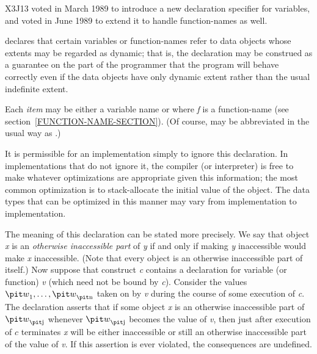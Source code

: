 \begin{newer}
X3J13 voted in March 1989  to introduce a new
declaration specifier  for variables,
and voted in June 1989 
to extend it to handle function-names as well.
\begin{flushdesc}
\item[\cdf{dynamic-extent}]

declares that certain variables or function-names refer to data objects
whose extents may be regarded as dynamic; that is, the declaration
may be construed as a guarantee on the part of the programmer that
the program will behave correctly even if the data objects have only
dynamic extent rather than the usual indefinite extent.

Each {\it item} may be either a variable name or 
where {\it f} is a function-name (see section~\ref{FUNCTION-NAME-SECTION}).
(Of course,  may be abbreviated in the usual way
as .)

  It is permissible for an implementation simply to ignore this declaration.
  In implementations that do not ignore it, the compiler (or interpreter)
  is free to make whatever optimizations are appropriate given this
  information; the most common optimization is to stack-allocate the
  initial value of the object. The data types that can be optimized in this manner
  may vary from implementation to implementation.

The meaning of this declaration can be stated more precisely.
We say that
object {\it x} is an {\it otherwise inaccessible part}
    of {\it y} if and only if making {\it y} inaccessible would make {\it x} inaccessible.
    (Note that every object is an otherwise inaccessible part of itself.)
  Now suppose that construct {\it c} contains a  declaration for
  variable (or function) {\it v} (which need not be bound by {\it c}).  Consider the values
  ${\it w}_1, \ldots, {\it w}_{\hbox{\scriptsize\it n}}$ taken on by {\it v} during the course of some execution of
  {\it c}.  The declaration asserts that if some object {\it x}
  is an otherwise inaccessible part of ${\it w}_{\hbox{\scriptsize\it j}}$
  whenever ${\it w}_{\hbox{\scriptsize\it j}}$ becomes the value of {\it v},
  then just after execution of
  $c$ terminates {\it x} will be either inaccessible or
  still an otherwise inaccessible part of the value of {\it v}.
  If this assertion is ever violated, the consequences are undefined.


\end{flushdesc}
\end{newer}
